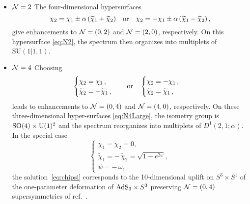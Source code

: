 \documentclass[a4paper, 11pt]{article}
\numberwithin{equation}{section}
\newcommand{\ts}[1]{\widetilde{#1}}
\newcommand{\SU}[1]{\mathrm{SU}( #1 )}
\newcommand{\SO}[1]{\mathrm{SO}( #1 )}
\newcommand{\+}{\oplus}
\begin{document}
\begin{itemize}
	\item {\boldmath ${\cal N}=2$} The four-dimensional hypersurfaces
	\begin{equation} \label{eq:N2}
		\chi_{2} = \chi_{1} \pm\alpha\,(\ts{\chi}_{1}+\ts{\chi}_{2})%
		\quad {\rm or}\quad \chi_{2} = -\chi_{1} \pm\alpha\,(\ts{\chi}_{1}-\ts{\chi}_{2})%
		\,,
	\end{equation}
	give enhancements to ${\cal N}=(0,2)$ and ${\cal N}=(2,0)$, respectively. On this hypersurface \eqref{eq:N2}, the spectrum then organizes into multiplets of $\SU{1\vert1,1}$.
	\item {\boldmath ${\cal N}=4$} Choosing
	\begin{equation} \label{eq:N4Large}
		\begin{cases}
			\chi_{2} = \chi_{1}\,,\\%
			\ts{\chi}_{2} = -\ts{\chi}_{1}\,,%
		\end{cases}
		\quad {\rm or }\quad
		\begin{cases}
			\chi_{2} = - \chi_{1}\,,\\%
			\ts{\chi}_{2} = \ts{\chi}_{1}\,,%
		\end{cases}%
	\end{equation}
	leads to enhancements to ${\cal N}=(0,4)$ and ${\cal N}=(4,0)$, respectively. On these three-dimensional hyper-surfaces \eqref{eq:N4Large}, the isometry group is $\SO{4}\times {\rm U}(1)^{2}$ and the spectrum reorganizes into multiplets of $D^{1}(2,1;\alpha)$. In the special case
	\begin{equation} \label{eq:limittoT4}
		\begin{cases}
			\chi_{1}=\chi_{2}= 0,\\
			\ts{\chi}_{1}=-\,\ts{\chi}_{2}=\sqrt{1-e^{2\omega}},\\
			\psi = -\,\omega,
		\end{cases}
	\end{equation}
	the solution~\eqref{eq:chipsi} corresponds to the 10-dimensional uplift on $S^{3}\times S^{1}$ of the one-parameter deformation of ${\rm AdS}_{3}\times S^{3}$ preserving ${\cal N}=(0,4)$ supersymmetries of ref.~\cite{Eloy:2021fhc}.
	

\end{itemize}
\end{document}
